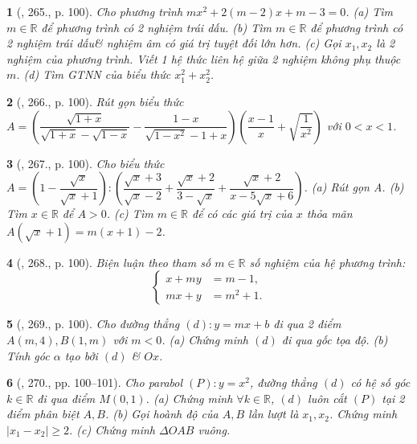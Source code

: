 \documentclass{article}
\newtheorem{baitoan}{}
\begin{document}
\begin{baitoan}[\cite{Tuyen_Toan_9_old}, 265., p. 100]
	Cho phương trình $mx^2 + 2(m - 2)x + m - 3 = 0$. (a) Tìm $m\in\mathbb{R}$ để phương trình có 2 nghiệm trái dấu. (b) Tìm $m\in\mathbb{R}$ để phương trình có 2 nghiệm trái dấu\& nghiệm âm có giá trị tuyệt đối lớn hơn. (c) Gọi $x_1,x_2$ là 2 nghiệm của phương trình. Viết 1 hệ thức liên hệ giữa 2 nghiệm không phụ thuộc $m$. (d) Tìm {\rm GTNN} của biểu thức $x_1^2 + x_2^2$.
\end{baitoan}

\begin{baitoan}[\cite{Tuyen_Toan_9_old}, 266., p. 100]
	Rút gọn biểu thức $A = \left(\dfrac{\sqrt{1 + x}}{\sqrt{1 + x} - \sqrt{1 - x}} - \dfrac{1 - x}{\sqrt{1 - x^2} - 1 + x}\right)$$\left(\dfrac{x - 1}{x} + \sqrt{\dfrac{1}{x^2}}\right)$ với $0 < x < 1$.
\end{baitoan}

\begin{baitoan}[\cite{Tuyen_Toan_9_old}, 267., p. 100]
	Cho biểu thức $A = \left(1 - \dfrac{\sqrt{x}}{\sqrt{x} + 1}\right):\left(\dfrac{\sqrt{x} + 3}{\sqrt{x} - 2} + \dfrac{\sqrt{x} + 2}{3 - \sqrt{x}} + \dfrac{\sqrt{x} + 2}{x - 5\sqrt{x} + 6}\right)$. (a) Rút gọn A. (b) Tìm $x\in\mathbb{R}$ để $A > 0$. (c) Tìm $m\in\mathbb{R}$ để có các giá trị của $x$ thỏa mãn $A(\sqrt{x} + 1) = m(x + 1) - 2$.
\end{baitoan}

\begin{baitoan}[\cite{Tuyen_Toan_9_old}, 268., p. 100]
	Biện luận theo tham số $m\in\mathbb{R}$ số nghiệm của hệ phương trình:
	\begin{equation*}
		\left\{\begin{split}
			x + my &= m - 1,\\
			mx + y &= m^2 + 1.
		\end{split}\right.
	\end{equation*}
\end{baitoan}

\begin{baitoan}[\cite{Tuyen_Toan_9_old}, 269., p. 100]
	Cho đường thẳng $(d):y = mx + b$ đi qua 2 điểm $A(m,4),B(1,m)$ với $m < 0$. (a) Chứng minh $(d)$ đi qua gốc tọa độ. (b) Tính góc $\alpha$ tạo bởi $(d)$ \& $Ox$.
\end{baitoan}

\begin{baitoan}[\cite{Tuyen_Toan_9_old}, 270., pp. 100--101]
	Cho parabol $(P):y = x^2$, đường thẳng $(d)$ có hệ số góc $k\in\mathbb{R}$ đi qua điểm $M(0,1)$. (a) Chứng minh $\forall k\in\mathbb{R}$, $(d)$ luôn cắt $(P)$ tại 2 điểm phân biệt $A,B$. (b) Gọi hoành độ của $A,B$ lần lượt là $x_1,x_2$. Chứng minh $|x_1 - x_2|\ge2$. (c) Chứng minh $\Delta OAB$ vuông.
\end{baitoan}
\end{document}
